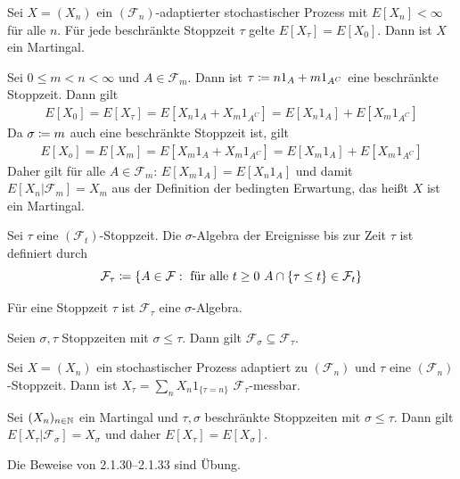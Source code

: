 \documentclass[a4paper,twoside,DIV15,BCOR12mm]{scrbook}
\newcommand{\cF}{\mathcal F}
\begin{document}
\begin{satz}
Sei $X=(X_n)$ ein $(\cF_n)$-adaptierter stochastischer Prozess mit $E[X_n]<\infty$ für alle $n$. Für jede beschränkte Stoppzeit $\tau$ gelte $E[X_\tau]=E[X_0]$. Dann ist $X$ ein Martingal.
\end{satz}

\begin{beweis}
Sei $0\leq m<n<\infty$ und $A\in \cF_m$. Dann ist $\tau\da n 1_A+m 1_{A^C}$ eine beschränkte Stoppzeit. Dann gilt
\begin{align*}
E[X_0]=E[X_\tau]=E[X_n 1_A+X_m 1_{A^C}]=E[X_n1_A]+E[X_m1_{A^C}]
\end{align*}
Da $\sigma\da m$ auch eine beschränkte Stoppzeit ist, gilt
\begin{align*}
E[X_o]=E[X_m]=E[X_m 1_A+X_m 1_{A^C}]=E[X_m1_A]+E[X_m1_{A^C}]
\end{align*}
Daher gilt für alle $A\in \cF_m$: $E[X_m1_A]=E[X_n1_A]$ und damit $E[X_n|\cF_m]=X_m$ aus der Definition der bedingten Erwartung, das heißt $X$ ist ein Martingal. 
\end{beweis}

\begin{definition}
Sei $\tau$ eine $(\cF_t)$-Stoppzeit. Die $\sigma$-Algebra der Ereignisse bis zur Zeit $\tau$ ist definiert durch 
\[
\cF_\tau\da \{A\in \cF: \mbox{ für alle } t\geq0 \mbox{ } A\cap\{\tau\leq t\}\in \cF_t\}
\]

\end{definition}

\begin{lemma}
Für eine Stoppzeit $\tau$ ist $\cF_\tau$ eine $\sigma$-Algebra.
\end{lemma}

\begin{lemma}
Seien $\sigma,\tau$ Stoppzeiten mit $\sigma \leq \tau$. Dann gilt $\cF_\sigma\subseteq\cF_\tau$.
\end{lemma}

\begin{lemma}
Sei $X=(X_n)$ ein stochastischer Prozess adaptiert zu $(\cF_n)$ und $\tau$ eine $(\cF_n)$-Stoppzeit. Dann ist $X_\tau=\sum\limits_nX_n1_{\{\tau=n\}}$ $\cF_\tau$-messbar.
\end{lemma}

\begin{satz}
\label{satz:2.1.33}Sei $(X_n)_{n\in\mathbb{N}}$ ein Martingal und $\tau,\sigma$ beschränkte Stoppzeiten mit $\sigma\leq\tau$. Dann gilt $E[X_\tau|\cF_\sigma]=X_\sigma$ und daher $E[X_\tau]=E[X_\sigma]$.
\end{satz}
\begin{beweis}
Die Beweise von 2.1.30--2.1.33 sind \"Ubung.
\end{beweis}
\end{document}
